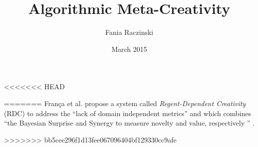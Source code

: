 \documentclass[11pt]{thesis} %
\title{Algorithmic Meta-Creativity}
\author{Fania Raczinski}
\date{March 2015}
\begin{document}
<<<<<<< HEAD
\nocite{*}

\printbibliography %
=======
Fran\c{c}a et al. propose a system called \textit{Regent-Dependent Creativity} (RDC) to address the ``lack of domain independent metrics'' and which combines ``the Bayesian Surprise and Synergy to measure novelty and value, respectively '' \autocite*{Franca2016}. 

\printbibliography 

>>>>>>> bb5cee296f1d13fee067096404bf129330cc9afe
\end{document}

